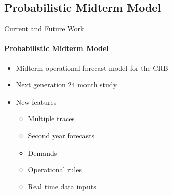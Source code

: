 \documentclass[compress]{beamer}
\begin{document}
\subsection{Probabilistic Midterm Model}
\begin{frame}{Current and Future Work}
\framesubtitle{Probabilistic Midterm Model}
\pause
\begin{itemize}
\item Midterm operational forecast model for the CRB
\item Next generation 24 month study
\item New features
	\begin{itemize}
	\item Multiple traces
	\item Second year forecasts
	\item Demands 
	\item Operational rules
	\item Real time data inputs
	\end{itemize}
\end{itemize}

\end{frame}
\end{document}
